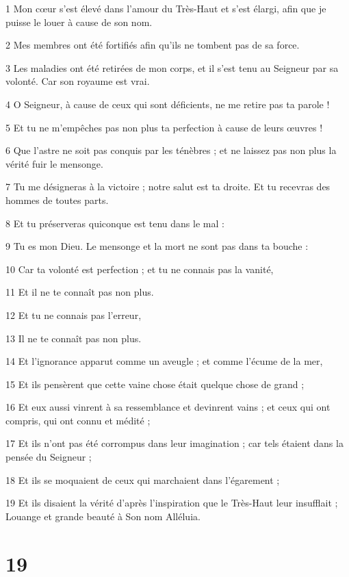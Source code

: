 \par 1 Mon cœur s'est élevé dans l'amour du Très-Haut et s'est élargi, afin que je puisse le louer à cause de son nom.
\par 2 Mes membres ont été fortifiés afin qu'ils ne tombent pas de sa force.
\par 3 Les maladies ont été retirées de mon corps, et il s'est tenu au Seigneur par sa volonté. Car son royaume est vrai.
\par 4 O Seigneur, à cause de ceux qui sont déficients, ne me retire pas ta parole !
\par 5 Et tu ne m'empêches pas non plus ta perfection à cause de leurs œuvres !
\par 6 Que l'astre ne soit pas conquis par les ténèbres ; et ne laissez pas non plus la vérité fuir le mensonge.
\par 7 Tu me désigneras à la victoire ; notre salut est ta droite. Et tu recevras des hommes de toutes parts.
\par 8 Et tu préserveras quiconque est tenu dans le mal :
\par 9 Tu es mon Dieu. Le mensonge et la mort ne sont pas dans ta bouche :
\par 10 Car ta volonté est perfection ; et tu ne connais pas la vanité,
\par 11 Et il ne te connaît pas non plus.
\par 12 Et tu ne connais pas l'erreur,
\par 13 Il ne te connaît pas non plus.
\par 14 Et l'ignorance apparut comme un aveugle ; et comme l'écume de la mer,
\par 15 Et ils pensèrent que cette vaine chose était quelque chose de grand ;
\par 16 Et eux aussi vinrent à sa ressemblance et devinrent vains ; et ceux qui ont compris, qui ont connu et médité ;
\par 17 Et ils n'ont pas été corrompus dans leur imagination ; car tels étaient dans la pensée du Seigneur ;
\par 18 Et ils se moquaient de ceux qui marchaient dans l'égarement ;
\par 19 Et ils disaient la vérité d'après l'inspiration que le Très-Haut leur insufflait ; Louange et grande beauté à Son nom Alléluia.

\chapter{19}

